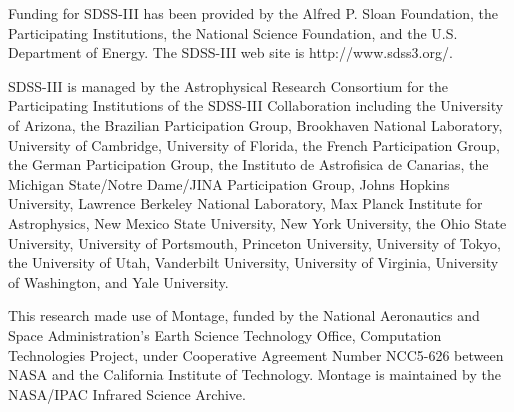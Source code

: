 \documentclass[10pt,preprint]{aastex}
\begin{document}
Funding for SDSS-III has been provided by the Alfred P. Sloan
Foundation, the Participating Institutions, the National Science
Foundation, and the U.S. Department of Energy. The SDSS-III web site
is http://www.sdss3.org/.

SDSS-III is managed by the Astrophysical Research Consortium for the
Participating Institutions of the SDSS-III Collaboration including the
University of Arizona, the Brazilian Participation Group, Brookhaven
National Laboratory, University of Cambridge, University of Florida,
the French Participation Group, the German Participation Group, the
Instituto de Astrofisica de Canarias, the Michigan State/Notre
Dame/JINA Participation Group, Johns Hopkins University, Lawrence
Berkeley National Laboratory, Max Planck Institute for Astrophysics,
New Mexico State University, New York University, the Ohio State
University, University of Portsmouth, Princeton University, University
of Tokyo, the University of Utah, Vanderbilt University, University of
Virginia, University of Washington, and Yale University.

This research made use of Montage, funded by the National Aeronautics and
Space Administration's Earth Science Technology Office, Computation
Technologies Project, under Cooperative Agreement Number NCC5-626 between
NASA and the California Institute of Technology. Montage is maintained by
the NASA/IPAC Infrared Science Archive.




\newpage


%
\end{document}
